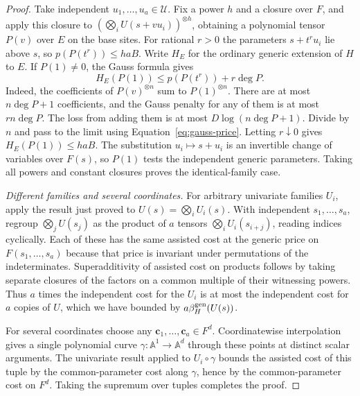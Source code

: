 \begin{proof}
Take independent $u_1,\ldots,u_a\in\mathcal U$. Fix a power $h$ and
a closure over $F$, and apply this closure to
$(\bigotimes_i U(s+v u_i))^{\otimes h}$, obtaining a polynomial
tensor $P(v)$ over $E$ on the base sites. For rational $r>0$ the
parameters $s+t^r u_i$ lie above $s$, so $p(P(t^r))\le haB$.
Write $H_E$ for the ordinary generic extension of $H$ to $E$.
If $P(1)\ne0$, the Gauss formula gives
\[
                 H_E(P(1))\le p(P(t^r))+r\deg P .
\]
Indeed, the coefficients of $P(v)^{\otimes n}$ sum to $P(1)^{\otimes n}$.
There are at most $n\deg P+1$ coefficients, and the Gauss penalty
for any of them is at most $rn\deg P$. The loss from adding them is
at most $D\log(n\deg P+1)$. Divide by $n$ and pass to the limit using
Equation~\eqref{eq:gauss-price}. Letting $r\downarrow0$ gives
$H_E(P(1))\le haB$. The substitution $u_i\mapsto s+u_i$ is an invertible change of
variables over $F(s)$, so $P(1)$ tests the independent generic
parameters.
Taking all powers and constant closures proves the identical-family case.

\smallskip\noindent\emph{Different families and several coordinates.}
For arbitrary univariate families $U_i$, apply the result just proved to
$U(s)=\bigotimes_iU_i(s)$. With independent $s_1,\ldots,s_a$, regroup
$\bigotimes_jU(s_j)$ as the product of $a$ tensors
$\bigotimes_i U_i(s_{i+j})$, reading indices cyclically. Each of these
has the same assisted cost at the generic price on $F(s_1,\ldots,s_a)$
because that price is invariant under permutations of the
indeterminates. Superadditivity of assisted cost on products follows by taking
separate closures of the factors on a common multiple of their
witnessing powers. Thus $a$ times the independent cost for the $U_i$
is at most the independent cost for $a$ copies of $U$, which we have
bounded by $a\beta_H^{\rm gen}(U(s))$.

For several coordinates choose any $\mathbf c_1,\ldots,\mathbf c_a\in F^d$.
Coordinatewise interpolation gives a single polynomial curve
$\gamma:\mathbb A^1\to\mathbb A^d$ through these points at distinct
scalar arguments. The univariate result applied to $U_i\circ\gamma$
bounds the assisted cost of this tuple by the common-parameter cost
along $\gamma$, hence by the common-parameter cost on $F^d$.
Taking the supremum over tuples completes the proof.
\end{proof}

